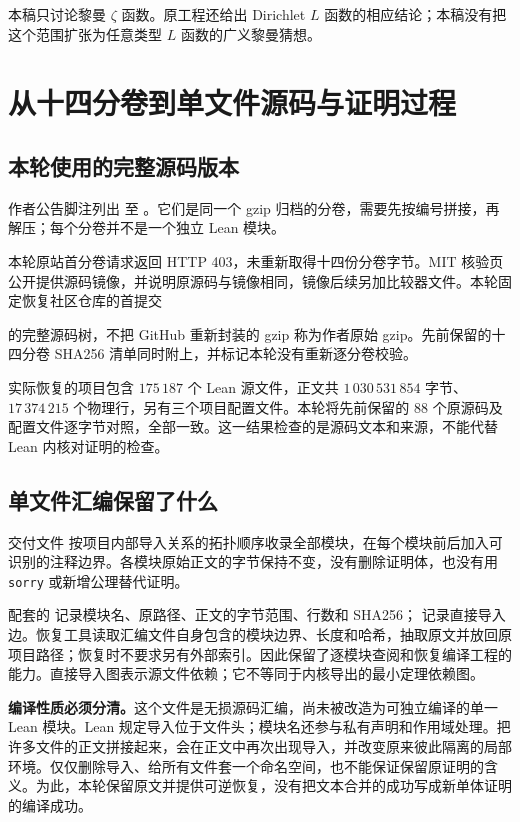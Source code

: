 \documentclass[UTF8,fontset=fandol,a4paper,openany,oneside]{ctexbook}
\theoremstyle{definition}
\theoremstyle{remark}
\begin{document}
本稿只讨论黎曼 $\zeta$ 函数。原工程还给出 Dirichlet $L$ 函数的相应结论；本稿没有把这个范围扩张为任意类型 $L$ 函数的广义黎曼猜想。

\chapter{从十四分卷到单文件源码与证明过程}
\label{chap:source-delivery}
\section{本轮使用的完整源码版本}
作者公告脚注列出  至 。它们是同一个 gzip 归档的分卷，需要先按编号拼接，再解压；每个分卷并不是一个独立 Lean 模块。

本轮原站首分卷请求返回 HTTP 403，未重新取得十四份分卷字节。MIT 核验页公开提供源码镜像，并说明原源码与镜像相同，镜像后续另加比较器文件。本轮固定恢复社区仓库的首提交
\begin{quote}\small
{}
\end{quote}
的完整源码树，不把 GitHub 重新封装的 gzip 称为作者原始 gzip。先前保留的十四分卷 SHA256 清单同时附上，并标记本轮没有重新逐分卷校验。

实际恢复的项目包含 $175\,187$ 个 Lean 源文件，正文共 $1\,030\,531\,854$ 字节、$17\,374\,215$ 个物理行，另有三个项目配置文件。本轮将先前保留的 $88$ 个原源码及配置文件逐字节对照，全部一致。这一结果检查的是源码文本和来源，不能代替 Lean 内核对证明的检查。

\section{单文件汇编保留了什么}
交付文件  按项目内部导入关系的拓扑顺序收录全部模块，在每个模块前后加入可识别的注释边界。各模块原始正文的字节保持不变，没有删除证明体，也没有用 \texttt{sorry} 或新增公理替代证明。

配套的  记录模块名、原路径、正文的字节范围、行数和 SHA256； 记录直接导入边。恢复工具读取汇编文件自身包含的模块边界、长度和哈希，抽取原文并放回原项目路径；恢复时不要求另有外部索引。因此保留了逐模块查阅和恢复编译工程的能力。直接导入图表示源文件依赖；它不等同于内核导出的最小定理依赖图。

\textbf{编译性质必须分清。}这个文件是无损源码汇编，尚未被改造为可独立编译的单一 Lean 模块。Lean 规定导入位于文件头；模块名还参与私有声明和作用域处理。把许多文件的正文拼接起来，会在正文中再次出现导入，并改变原来彼此隔离的局部环境。仅仅删除导入、给所有文件套一个命名空间，也不能保证保留原证明的含义。为此，本轮保留原文并提供可逆恢复，没有把文本合并的成功写成新单体证明的编译成功。
\end{document}
